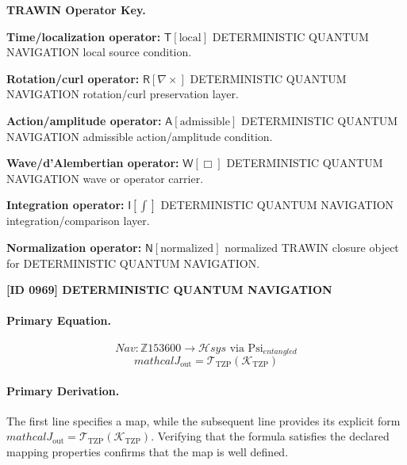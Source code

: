 \par\vspace{0.45\baselineskip}
\noindent\begin{minipage}[t]{\linewidth}
\begingroup
\small
\raggedright
\textbf{TRAWIN Operator Key.}\par
\noindent\textbf{Time/localization operator:} $\mathsf{T}\!\left[\mathrm{local}\right]$ DETERMINISTIC QUANTUM NAVIGATION local source condition.\par
\noindent\textbf{Rotation/curl operator:} $\mathsf{R}\!\left[\nabla\times\right]$ DETERMINISTIC QUANTUM NAVIGATION rotation/curl preservation layer.\par
\noindent\textbf{Action/amplitude operator:} $\mathsf{A}\!\left[\mathrm{admissible}\right]$ DETERMINISTIC QUANTUM NAVIGATION admissible action/amplitude condition.\par
\noindent\textbf{Wave/d'Alembertian operator:} $\mathsf{W}\!\left[\Box\right]$ DETERMINISTIC QUANTUM NAVIGATION wave or operator carrier.\par
\noindent\textbf{Integration operator:} $\mathsf{I}\!\left[\int\right]$ DETERMINISTIC QUANTUM NAVIGATION integration/comparison layer.\par
\noindent\textbf{Normalization operator:} $\mathsf{N}\!\left[\mathrm{normalized}\right]$ normalized TRAWIN closure object for DETERMINISTIC QUANTUM NAVIGATION.\par
\endgroup
\end{minipage}

\clearpage
\noindent\textbf{[ID 0969] DETERMINISTIC QUANTUM NAVIGATION}\par
\vspace{0.35em}
\paragraph{Primary Equation.}
\[
Nav: \mathbb{Z} {153600} \to \mathcal{H} {sys} \text{ via } \mathrm{Psi}_{entangled}
\]
\[
mathcal{J}_{\mathrm{out}} = \mathcal{T}_{\mathrm{TZP}}\!\left(\mathcal{K}_{\mathrm{TZP}}\right)
\]

\paragraph{Primary Derivation.}
The first line specifies a map, while the subsequent line provides its explicit form \( mathcal{J}_{\mathrm{out}} = \mathcal{T}_{\mathrm{TZP}}\!\left(\mathcal{K}_{\mathrm{TZP}}\right) \). Verifying that the formula satisfies the declared mapping properties confirms that the map is well defined.
